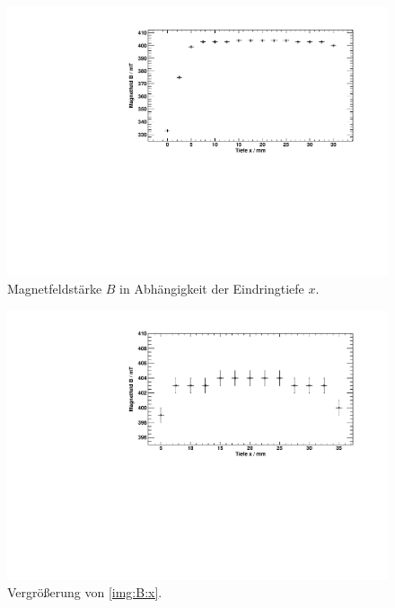 \begin{figure}[H]
\begin{center}
  \includegraphics[width=\textwidth]{../img/01-B-x.pdf}
  \caption{Magnetfeldstärke $B$ in Abhängigkeit der Eindringtiefe $x$.}
  \label{img:B:x}
\end{center}
\end{figure}
\begin{figure}[H]
\begin{center}
  \includegraphics[width=\textwidth]{../img/01-B-x-zoom.pdf}
  \caption{Vergrößerung von \autoref{img:B:x}.}
  \label{img:B:x:zoom}
\end{center}
\end{figure}

